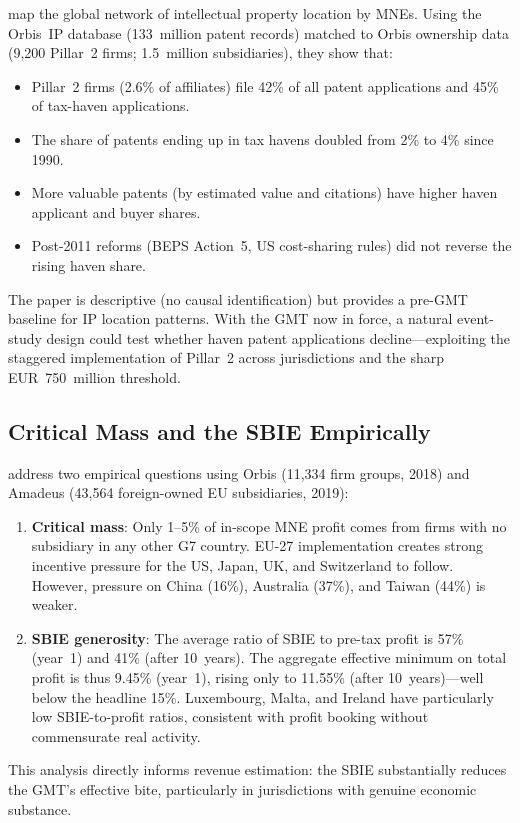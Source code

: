 \documentclass[11pt,a4paper]{article}
\begin{document}
\citet{bilicka2023} map the global network of intellectual property location by MNEs. Using the Orbis~IP database (133~million patent records) matched to Orbis ownership data (9,200 Pillar~2 firms; 1.5~million subsidiaries), they show that:
\begin{itemize}[nosep]
    \item Pillar~2 firms (2.6\% of affiliates) file 42\% of all patent applications and 45\% of tax-haven applications.
    \item The share of patents ending up in tax havens doubled from 2\% to 4\% since 1990.
    \item More valuable patents (by estimated value and citations) have higher haven applicant and buyer shares.
    \item Post-2011 reforms (BEPS Action~5, US cost-sharing rules) did not reverse the rising haven share.
\end{itemize}
The paper is descriptive (no causal identification) but provides a pre-GMT baseline for IP location patterns. With the GMT now in force, a natural event-study design could test whether haven patent applications decline---exploiting the staggered implementation of Pillar~2 across jurisdictions and the sharp EUR~750~million threshold.

\subsection{Critical Mass and the SBIE Empirically}
\label{subsec:devereux_emp}

\citet{devereux2023} address two empirical questions using Orbis (11,334 firm groups, 2018) and Amadeus (43,564 foreign-owned EU subsidiaries, 2019):
\begin{enumerate}[nosep]
    \item \textbf{Critical mass}: Only 1--5\% of in-scope MNE profit comes from firms with no subsidiary in any other G7 country. EU-27 implementation creates strong incentive pressure for the US, Japan, UK, and Switzerland to follow. However, pressure on China (16\%), Australia (37\%), and Taiwan (44\%) is weaker.
    \item \textbf{SBIE generosity}: The average ratio of SBIE to pre-tax profit is 57\% (year~1) and 41\% (after 10~years). The aggregate effective minimum on total profit is thus 9.45\% (year~1), rising only to 11.55\% (after 10~years)---well below the headline 15\%. Luxembourg, Malta, and Ireland have particularly low SBIE-to-profit ratios, consistent with profit booking without commensurate real activity.
\end{enumerate}
This analysis directly informs revenue estimation: the SBIE substantially reduces the GMT's effective bite, particularly in jurisdictions with genuine economic substance.
\end{document}
